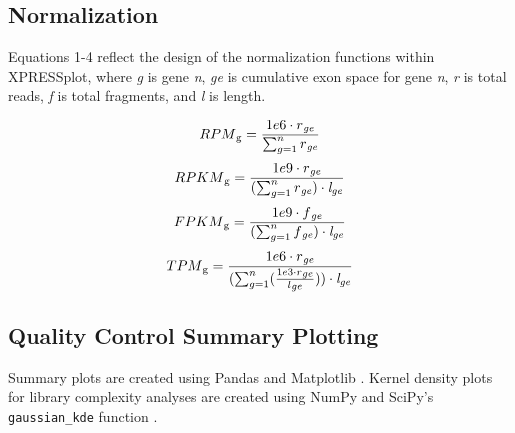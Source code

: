 \documentclass[10pt, oneside]{article}
\begin{document}
\subsection*{Normalization}
Equations 1-4 reflect the design of the normalization functions within XPRESSplot, where \textit{g} is gene \textit{n}, \textit{ge} is cumulative exon space for gene \textit{n}, \textit{r} is total reads, \textit{f} is total fragments, and \textit{l} is length.

  \begin{equation}
    RPM\textsubscript{g} = \frac{1e6 \cdot r\textsubscript{\textit{ge}}}{\sum_{g=1}^{n} r\textsubscript{\textit{ge}}}
  \end{equation}
  \begin{equation}
    RPKM\textsubscript{g} = \frac{1e9 \cdot r\textsubscript{\textit{ge}}}{(\sum_{g=1}^{n} r\textsubscript{\textit{ge}}) \cdot \textit{l} \textsubscript{\textit{ge}}}
  \end{equation}
  \begin{equation}
    FPKM\textsubscript{g} = \frac{1e9 \cdot f\textsubscript{\textit{ge}}}{(\sum_{g=1}^{n} f\textsubscript{\textit{ge}}) \cdot \textit{l} \textsubscript{\textit{ge}}}
  \end{equation}
  \begin{equation}
    TPM\textsubscript{g} = \frac{1e6 \cdot r\textsubscript{\textit{ge}}}{(\sum_{g=1}^{n} (\frac{1e3 \cdot r\textsubscript{\textit{ge}}}{l\textsubscript{\textit{ge}}})) \cdot \textit{l} \textsubscript{\textit{ge}}}
  \end{equation}


\subsection*{Quality Control Summary Plotting}
Summary plots are created using Pandas \cite{pandas} and Matplotlib \cite{matplotlib}. Kernel density plots for library complexity analyses are created using NumPy \cite{numpy1, numpy2} and SciPy's \texttt{gaussian\_kde} function \cite{scipy}.\\
\end{document}
